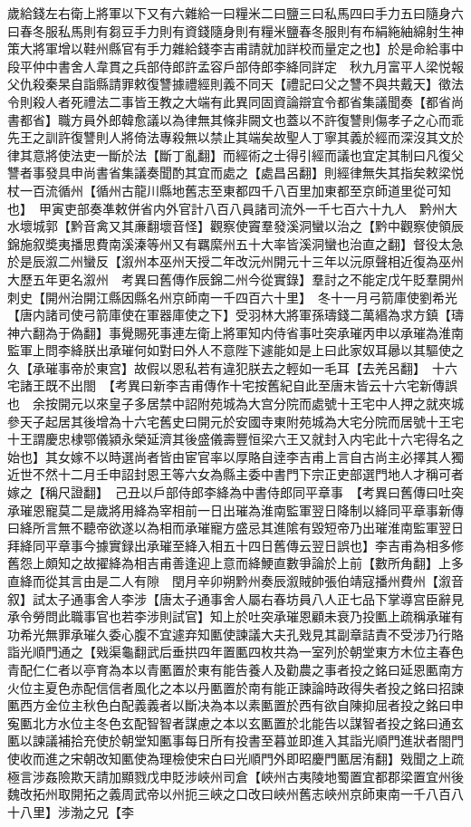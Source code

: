 歲給錢左右衛上將軍以下又有六雜給一曰糧米二曰鹽三曰私馬四曰手力五曰隨身六曰春冬服私馬則有芻豆手力則有資錢隨身則有糧米鹽春冬服則有布絹絁紬綿射生神策大將軍增以鞋州縣官有手力雜給錢李吉甫請就加詳校而量定之也】於是命給事中段平仲中書舍人韋貫之兵部侍郎許孟容戶部侍郎李絳同詳定　秋九月富平人梁悦報父仇殺秦杲自詣縣請罪敕復讐據禮經則義不同天【禮記曰父之讐不與共戴天】徵法令則殺人者死禮法二事皆王教之大端有此異同固資論辯宜令都省集議聞奏【都省尚書都省】職方員外郎韓愈議以為律無其條非闕文也蓋以不許復讐則傷孝子之心而乖先王之訓許復讐則人將倚法專殺無以禁止其端矣故聖人丁寧其義於經而深沒其文於律其意將使法吏一斷於法【斷丁亂翻】而經術之士得引經而議也宜定其制曰凡復父讐者事發具申尚書省集議奏聞酌其宜而處之【處昌呂翻】則經律無失其指矣敕梁悦杖一百流循州【循州古龍川縣地舊志至東都四千八百里加東都至京師道里從可知也】　甲寅吏部奏凖敕併省内外官計八百八員諸司流外一千七百六十九人　黔州大水壞城郭【黔音禽又其亷翻壞音怪】觀察使竇羣發溪洞蠻以治之【黔中觀察使領辰錦施叙奬夷播思費南溪溱等州又有羈縻州五十大率皆溪洞蠻也治直之翻】督役太急於是辰溆二州蠻反【溆州本巫州天授二年改沅州開元十三年以沅原聲相近復為巫州大歷五年更名溆州　考異曰舊傳作辰錦二州今從實錄】羣討之不能定戊午貶羣開州刺史【開州治開江縣因縣名州京師南一千四百六十里】　冬十一月弓箭庫使劉希光【唐内諸司使弓箭庫使在軍器庫使之下】受羽林大將軍孫璹錢二萬緡為求方鎮【璹神六翻為于偽翻】事覺賜死事連左衛上將軍知内侍省事吐突承璀丙申以承璀為淮南監軍上問李絳朕出承璀何如對曰外人不意陛下遽能如是上曰此家奴耳曏以其驅使之久【承璀事帝於東宫】故假以恩私若有違犯朕去之輕如一毛耳【去羌呂翻】　十六宅諸王既不出閤　【考異曰新李吉甫傳作十宅按舊紀自此至唐末皆云十六宅新傳誤也　余按開元以來皇子多居禁中詔附苑城為大宫分院而處號十王宅中人押之就夾城參天子起居其後增為十六宅舊史曰開元於安國寺東附苑城為大宅分院而居號十王宅十王謂慶忠棣鄂儀潁永榮延濟其後盛儀壽豐恒梁六王又就封入内宅此十六宅得名之始也】其女嫁不以時選尚者皆由宦官率以厚賂自逹李吉甫上言自古尚主必擇其人獨近世不然十二月壬申詔封恩王等六女為縣主委中書門下宗正吏部選門地人才稱可者嫁之【稱尺證翻】　己丑以戶部侍郎李絳為中書侍郎同平章事　【考異曰舊傳曰吐突承璀恩寵莫二是歲將用絳為宰相前一日出璀為淮南監軍翌日降制以絳同平章事新傳曰絳所言無不聽帝欲遂以為相而承璀寵方盛忌其進隂有毀短帝乃出璀淮南監軍翌日拜絳同平章事今據實録出承璀至絳入相五十四日舊傳云翌日誤也】李吉甫為相多修舊怨上頗知之故擢絳為相吉甫善逢迎上意而絳鯁直數爭論於上前【數所角翻】上多直絳而從其言由是二人有隙　閏月辛卯朔黔州奏辰溆賊帥張伯靖寇播州費州【溆音叙】試太子通事舍人李涉【唐太子通事舍人屬右春坊員八人正七品下掌導宫臣辭見承令勞問此職事官也若李涉則試官】知上於吐突承璀恩顧未衰乃投匭上疏稱承璀有功希光無罪承璀久委心腹不宜遽弃知匭使諫議大夫孔戣見其副章詰責不受涉乃行賂詣光順門通之【戣渠龜翻武后垂拱四年置匭四枚共為一室列於朝堂東方木位主春色青配仁仁者以亭育為本以青匭置於東有能告養人及勸農之事者投之銘曰延恩匭南方火位主夏色赤配信信者風化之本以丹匭置於南有能正諫論時政得失者投之銘曰招諫匭西方金位主秋色白配義義者以斷决為本以素匭置於西有欲自陳抑屈者投之銘曰申寃匭北方水位主冬色玄配智智者謀慮之本以玄匭置於北能告以謀智者投之銘曰通玄匭以諫議補拾充使於朝堂知匭事每日所有投書至暮並即進入其詣光順門進狀者閤門使收而進之宋朝改知匭使為理檢使宋白曰光順門外即昭慶門匭居洧翻】戣聞之上疏極言涉姦險欺天請加顯戮戊申貶涉峽州司倉【峽州古夷陵地蜀置宜都郡梁置宜州後魏改拓州取開拓之義周武帝以州扼三峽之口改曰峽州舊志峽州京師東南一千八百八十八里】涉渤之兄【李